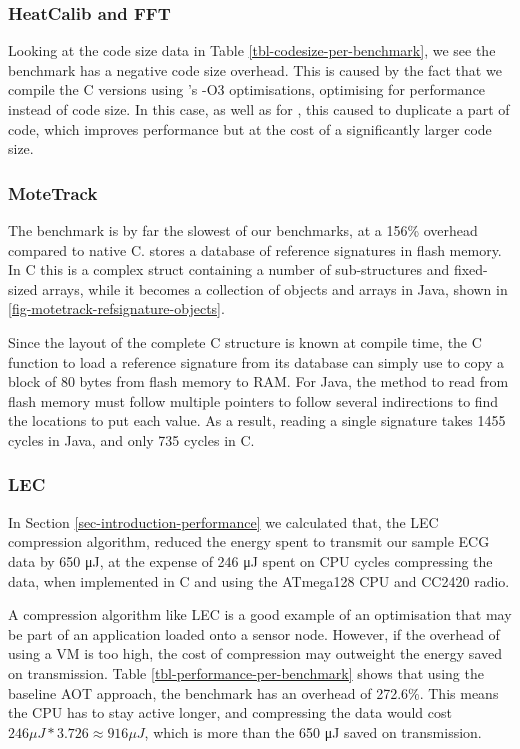 \subsubsection{HeatCalib and FFT}
Looking at the code size data in Table \ref{tbl-codesize-per-benchmark}, we see the  benchmark has a negative code size overhead. This is caused by the fact that we compile the C versions using 's -O3 optimisations, optimising for performance instead of code size. In this case, as well as for , this caused  to duplicate a part of code, which improves performance but at the cost of a significantly larger code size.

\subsubsection{MoteTrack}
The  benchmark is by far the slowest of our benchmarks, at a 156\% overhead compared to native C.  stores a database of reference signatures in flash memory. In C this is a complex struct containing a number of sub-structures and fixed-sized arrays, while it becomes a collection of objects and arrays in Java, shown in \ref{fig-motetrack-refsignature-objects}.

Since the layout of the complete C structure is known at compile time, the C function to load a reference signature from its database can simply use  to copy a block of 80 bytes from flash memory to RAM. For Java, the method to read from flash memory must follow multiple pointers to follow several indirections to find the locations to put each value. As a result, reading a single signature takes 1455 cycles in Java, and only 735 cycles in C.

\subsubsection{LEC}
In Section \ref{sec-introduction-performance} we calculated that, the LEC compression algorithm, reduced the energy spent to transmit our sample ECG data by 650 μJ, at the expense of 246 μJ spent on CPU cycles compressing the data, when implemented in C and using the ATmega128 CPU and CC2420 radio.

A compression algorithm like LEC is a good example of an optimisation that may be part of an application loaded onto a sensor node. However, if the overhead of using a VM is too high, the cost of compression may outweight the energy saved on transmission. Table \ref{tbl-performance-per-benchmark} shows that using the baseline AOT approach, the  benchmark has an overhead of 272.6\%. This means the CPU has to stay active longer, and compressing the data would cost $246 \mu J * 3.726 \approx 916 \mu J$, which is more than the 650 μJ saved on transmission.

